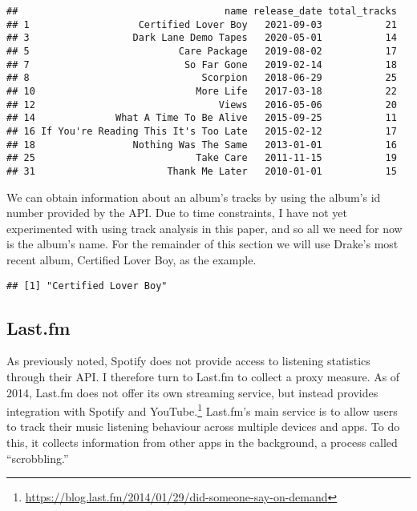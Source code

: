 \documentclass[
  11pt,
]{article}
\newenvironment{Shaded}{\begin{snugshade}}{\end{snugshade}}
\newcommand{\AttributeTok}[1]{\textcolor[rgb]{0.77,0.63,0.00}{#1}}
\newcommand{\DecValTok}[1]{\textcolor[rgb]{0.00,0.00,0.81}{#1}}
\newcommand{\FunctionTok}[1]{\textcolor[rgb]{0.00,0.00,0.00}{#1}}
\newcommand{\NormalTok}[1]{#1}
\newcommand{\OtherTok}[1]{\textcolor[rgb]{0.56,0.35,0.01}{#1}}
\newcommand{\SpecialCharTok}[1]{\textcolor[rgb]{0.00,0.00,0.00}{#1}}
\begin{document}
\begin{verbatim}
##                                    name release_date total_tracks
## 1                   Certified Lover Boy   2021-09-03           21
## 3                  Dark Lane Demo Tapes   2020-05-01           14
## 5                          Care Package   2019-08-02           17
## 7                           So Far Gone   2019-02-14           18
## 8                              Scorpion   2018-06-29           25
## 10                            More Life   2017-03-18           22
## 12                                Views   2016-05-06           20
## 14              What A Time To Be Alive   2015-09-25           11
## 16 If You're Reading This It's Too Late   2015-02-12           17
## 18                 Nothing Was The Same   2013-01-01           16
## 25                            Take Care   2011-11-15           19
## 31                       Thank Me Later   2010-01-01           15
\end{verbatim}

We can obtain information about an album's tracks by using the album's
id number provided by the API. Due to time constraints, I have not yet
experimented with using track analysis in this paper, and so all we need
for now is the album's name. For the remainder of this section we will
use Drake's most recent album, Certified Lover Boy, as the example.

\begin{Shaded}
\end{Shaded}

\begin{verbatim}
## [1] "Certified Lover Boy"
\end{verbatim}

\hypertarget{last.fm}{%
\subsection{Last.fm}\label{last.fm}}

As previously noted, Spotify does not provide access to listening
statistics through their API. I therefore turn to Last.fm to collect a
proxy measure. As of 2014, Last.fm does not offer its own streaming
service, but instead provides integration with Spotify and
YouTube.\footnote{\url{https://blog.last.fm/2014/01/29/did-someone-say-on-demand}}
Last.fm's main service is to allow users to track their music listening
behaviour across multiple devices and apps. To do this, it collects
information from other apps in the background, a process called
``scrobbling.''
\end{document}
